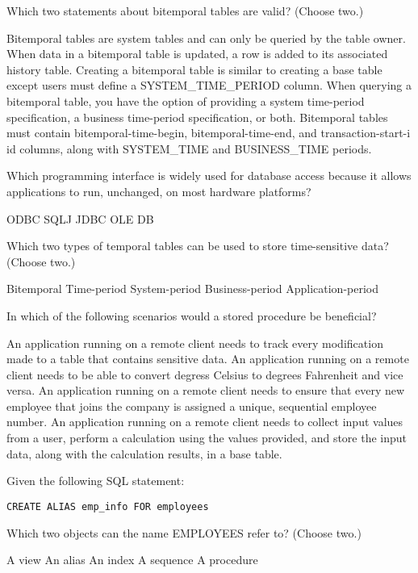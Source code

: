 \documentclass[11pt]{exam}
\begin{document}
\begin{questions}
\question[1]
Which two statements about bitemporal tables are valid? (Choose two.)
\begin{choices}
\choice Bitemporal tables are system tables and can only be queried by the table owner.
\choice When data in a bitemporal table is updated, a row is added to its associated history table.
\choice Creating a bitemporal table is similar to creating a base table except users must define a 
SYSTEM\_TIME\_PERIOD column.
\choice When querying a bitemporal table, you have the option of providing a system time-period 
specification, a business time-period specification, or both.
\choice Bitemporal tables must contain bitemporal-time-begin, bitemporal-time-end, and transaction-start-i
id columns, along with SYSTEM\_TIME and BUSINESS\_TIME periods.
\end{choices}

\question[1]
Which programming interface is widely used for database access because it allows applications to run, 
unchanged, on most hardware platforms?
\begin{choices}
\choice ODBC
\choice SQLJ
\choice JDBC
\choice OLE DB
\end{choices}

\question[1]
Which two types of temporal tables can be used to store time-sensitive data? (Choose two.)
\begin{choices}
\choice Bitemporal
\choice Time-period
\choice System-period
\choice Business-period
\choice Application-period
\end{choices}

\question[1]
In which of the following scenarios would a stored procedure be beneficial?
\begin{choices}
\choice An application running on a remote client needs to track every modification made to a 
table that contains sensitive data.
\choice An application running on a remote client needs to be able to convert degress Celsius to degrees
Fahrenheit and vice versa.
\choice An application running on a remote client needs to ensure that every new employee that joins the 
company is assigned a unique, sequential employee number.
\choice An application running on a remote client needs to collect input values from a user, 
perform a calculation using the values provided, and store the input data, along with the calculation
results, in a base table.
\end{choices}

\newpage
\question[1]
Given the following SQL statement:
\begin{verbatim}
CREATE ALIAS emp_info FOR employees
\end{verbatim}
Which two objects can the name EMPLOYEES refer to? (Choose two.)
\begin{choices}
\choice A view
\choice An alias
\choice An index
\choice A sequence
\choice A procedure
\end{choices}


\end{questions}
\end{document}
